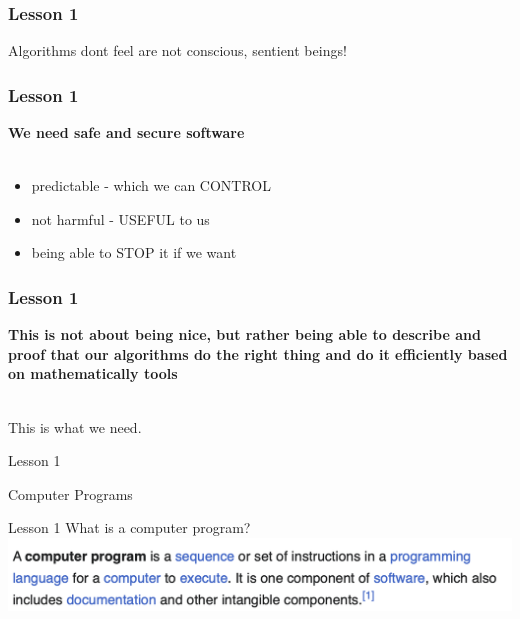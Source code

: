 \documentclass[aspectratio=1610]{beamer}
\begin{document}
\begin{frame}
\frametitle{Lesson 1}

\Huge Algorithms 
\alert{dont feel} are not 
 \alert{conscious},
 \alert{sentient beings}!
\end{frame}



\begin{frame}
\frametitle{Lesson 1}
\huge
\textbf {We need safe and secure software\\~\\}
\begin{itemize}
	 \item predictable - \alert{which we can CONTROL}
	 \item not harmful - \alert{USEFUL to us}
	 \item \alert{being able to STOP it if we want}
\end{itemize}
\end{frame}


\begin{frame}
\frametitle{Lesson 1}
\huge
\textbf {This is not about being nice, but rather being able to describe and proof that our algorithms do the right thing and do it efficiently based on mathematically tools\\~\\}

This is what we need.
\end{frame}




\begin{frame}{Lesson 1}{}
\begin{center}
\Huge Computer Programs
\end{center}
\end{frame}


\begin{frame}{Lesson 1}{}
{\Huge{What is a computer program?}}
\includegraphics[scale=0.67]{Images/program}
\end{frame}
\end{document}
